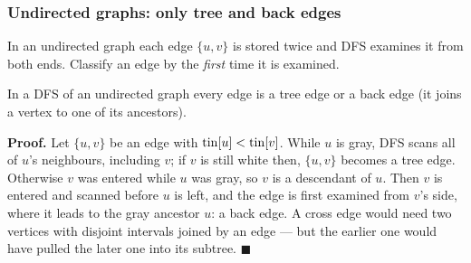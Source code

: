 \subsubsection*{Undirected graphs: only tree and back edges}

In an undirected graph each edge $\{u, v\}$ is stored twice and DFS examines it from both ends. Classify an edge by the \emph{first} time it is examined.

\begin{theorembox}
In a DFS of an undirected graph every edge is a tree edge or a back edge (it joins a vertex to one of its ancestors).
\end{theorembox}

\textbf{Proof.} Let $\{u, v\}$ be an edge with $\mathrm{tin}[u] < \mathrm{tin}[v]$. While $u$ is gray, DFS scans all of $u$'s neighbours, including $v$; if $v$ is still white then, $\{u,v\}$ becomes a tree edge. Otherwise $v$ was entered while $u$ was gray, so $v$ is a descendant of $u$. Then $v$ is entered and scanned before $u$ is left, and the edge is first examined from $v$'s side, where it leads to the gray ancestor $u$: a back edge. A cross edge would need two vertices with disjoint intervals joined by an edge --- but the earlier one would have pulled the later one into its subtree. \hfill$\blacksquare$

\begin{diagrambox}
\end{diagrambox}

